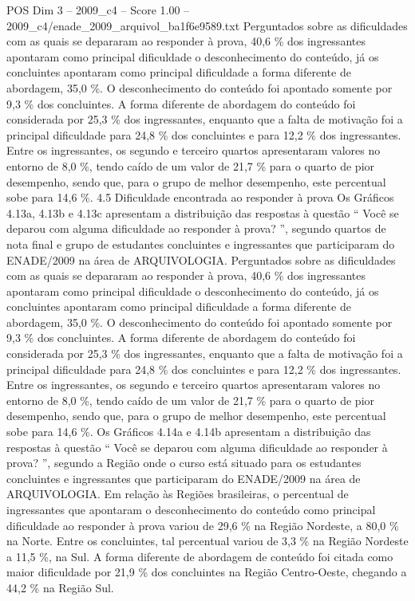 \begin{textsample}{POS Dim 3 – 2009\_c4 – Score 1.00 – 2009\_c4/enade\_2009\_arquivol\_ba1f6e9589.txt}
Perguntados sobre as dificuldades com as quais se depararam ao responder à prova, 40,6 \% dos ingressantes apontaram como principal dificuldade o desconhecimento do conteúdo, já os concluintes apontaram como principal dificuldade a forma diferente de abordagem, 35,0 \%.
O desconhecimento do conteúdo foi apontado somente por 9,3 \% dos concluintes.
A forma diferente de abordagem do conteúdo foi considerada por 25,3 \% dos ingressantes, enquanto que a falta de motivação foi a principal dificuldade para 24,8 \% dos concluintes e para 12,2 \% dos ingressantes.
Entre os ingressantes, os segundo e terceiro quartos apresentaram valores no entorno de 8,0 \%, tendo caído de um valor de 21,7 \% para o quarto de pior desempenho, sendo que, para o grupo de melhor desempenho, este percentual sobe para 14,6 \%. 4.5 Dificuldade encontrada ao responder à prova Os Gráficos 4.13a, 4.13b e 4.13c apresentam a distribuição das respostas à questão “ Você se deparou com alguma dificuldade ao responder à prova? ”, segundo quartos de nota final e grupo de estudantes concluintes e ingressantes que participaram do ENADE/2009 na área de ARQUIVOLOGIA.
Perguntados sobre as dificuldades com as quais se depararam ao responder à prova, 40,6 \% dos ingressantes apontaram como principal dificuldade o desconhecimento do conteúdo, já os concluintes apontaram como principal dificuldade a forma diferente de abordagem, 35,0 \%.
O desconhecimento do conteúdo foi apontado somente por 9,3 \% dos concluintes.
A forma diferente de abordagem do conteúdo foi considerada por 25,3 \% dos ingressantes, enquanto que a falta de motivação foi a principal dificuldade para 24,8 \% dos concluintes e para 12,2 \% dos ingressantes.
Entre os ingressantes, os segundo e terceiro quartos apresentaram valores no entorno de 8,0 \%, tendo caído de um valor de 21,7 \% para o quarto de pior desempenho, sendo que, para o grupo de melhor desempenho, este percentual sobe para 14,6 \%.
Os Gráficos 4.14a e 4.14b apresentam a distribuição das respostas à questão “ Você se deparou com alguma dificuldade ao responder à prova? ”, segundo a Região onde o curso está situado para os estudantes concluintes e ingressantes que participaram do ENADE/2009 na área de ARQUIVOLOGIA.
Em relação às Regiões brasileiras, o percentual de ingressantes que apontaram o desconhecimento do conteúdo como principal dificuldade ao responder à prova variou de 29,6 \% na Região Nordeste, a 80,0 \% na Norte.
Entre os concluintes, tal percentual variou de 3,3 \% na Região Nordeste a 11,5 \%, na Sul.
A forma diferente de abordagem de conteúdo foi citada como maior dificuldade por 21,9 \% dos concluintes na Região Centro-Oeste, chegando a 44,2 \% na Região Sul.

\end{textsample}
